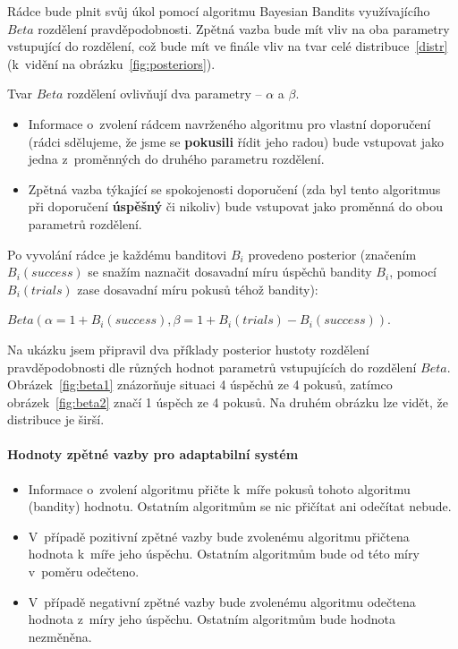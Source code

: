 \documentclass[thesis=M,czech]{FITthesis}[2014/05/07]
\begin{document}
Rádce bude plnit svůj úkol pomocí algoritmu Bayesian Bandits využívajícího ${Beta}$ rozdělení pravděpodobnosti. Zpětná vazba bude mít vliv na oba parametry vstupující do rozdělení, což bude mít ve finále vliv na tvar celé distribuce~\ref{distr} (k~vidění na obrázku~\ref{fig:posteriors}). 

Tvar ${Beta}$ rozdělení ovlivňují dva parametry – $\alpha$ a $\beta$.

\begin{itemize}
	\item Informace o~zvolení rádcem navrženého algoritmu pro vlastní doporučení (rádci sdělujeme, že jsme se \textbf{pokusili} řídit jeho radou) bude vstupovat jako jedna z~proměnných do druhého parametru rozdělení.
	\item Zpětná vazba týkající se spokojenosti doporučení (zda byl tento algoritmus při doporučení \textbf{úspěšný} či nikoliv) bude vstupovat jako proměnná do obou parametrů rozdělení.
\end{itemize}

Po vyvolání rádce je každému banditovi $B_i$ provedeno posterior (značením $B_i(success)$ se snažím naznačit dosavadní míru úspěchů bandity $B_i$, pomocí $B_i(trials)$ zase dosavadní míru pokusů téhož bandity):

\begin{center}
${Beta}(\alpha = 1 + B_i(success), \beta = 1 + B_i(trials) - B_i(success))$.
\end{center}

Na ukázku jsem připravil dva příklady posterior hustoty rozdělení pravděpodobnosti dle různých hodnot parametrů vstupujících do rozdělení ${Beta}$. Obrázek~\ref{fig:beta1} znázorňuje situaci 4 úspěchů ze 4 pokusů, zatímco obrázek~\ref{fig:beta2} značí 1 úspěch ze 4 pokusů. Na druhém obrázku lze vidět, že distribuce je širší.

\paragraph{Hodnoty zpětné vazby pro adaptabilní systém}

\begin{itemize}
	\item Informace o~zvolení algoritmu přičte k~míře pokusů tohoto algoritmu (bandity) hodnotu. Ostatním algoritmům se nic přičítat ani odečítat nebude.
	\item V~případě pozitivní zpětné vazby bude zvolenému algoritmu přičtena hodnota k~míře jeho úspěchu. Ostatním algoritmům bude od této míry v~poměru odečteno.
	\item V~případě negativní zpětné vazby bude zvolenému algoritmu odečtena hodnota z~míry jeho úspěchu. Ostatním algoritmům bude hodnota nezměněna.
\end{itemize}
\end{document}
